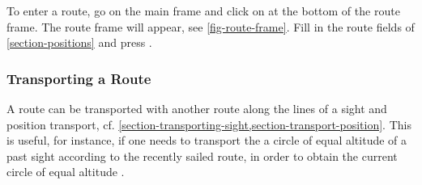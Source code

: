 \documentclass{ol-softwaremanual}
\begin{document}
To enter a route, go on the main frame and click on  at the bottom of the route frame. The route frame will appear, see \cref{fig-route-frame}. Fill in the route fields of \cref{section-positions} and press . 

\subsubsection{Transporting a Route}\label{section-transporting-route}

A route can be transported with another route along the lines of a \gls{sight} and position transport, cf. \cref{section-transporting-sight,section-transport-position}. This is useful, for instance, if one needs to transport the a  circle of equal altitude of a past \gls{sight} according to the recently sailed route, in order to obtain the current circle of equal altitude \cite{bowditch2002the}.

\pagebreak
\printacronyms[pages={display=all,seq/use=false}]
\printnoidxglossaries


\end{document}
